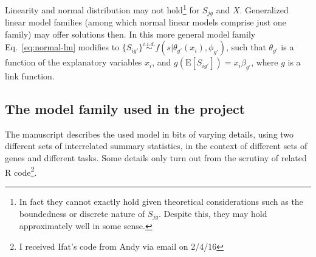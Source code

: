\documentclass[letterpaper]{article}
\begin{document}
Linearity and normal distribution may not hold\footnote{In fact they cannot exactly hold given
theoretical considerations such as the boundedness or discrete nature of \(S_{jg}\).  Despite this,
they may hold approximately well in some sense.} for \(S_{jg}\) and \(X\).  Generalized linear model
families (among which normal linear models comprise just one family) may offer solutions then.  In
this more general model family Eq.~\ref{eq:normal-lm} modifies to \(\{S_{ig'}\}
\overset{i.i.d.}{\sim} f(s | \theta_{g'}(x_i), \phi_{g'})\), such that \(\theta_{g'}\) is a function
of the explanatory variables \(x_i\), and \(g(\mathrm{E}[S_{ig'}]) = x_i \beta_{g'}\), where \(g\)
is a link function.

\subsection{The model family used in the project}

The manuscript describes the used model in bits of varying details, using two
different sets of interrelated summary statistics, in the context of different
sets of genes and different tasks.  Some details only turn out from the
scrutiny of related R code\footnote{I received Ifat's code from Andy via email
on 2/4/16}.
\end{document}
